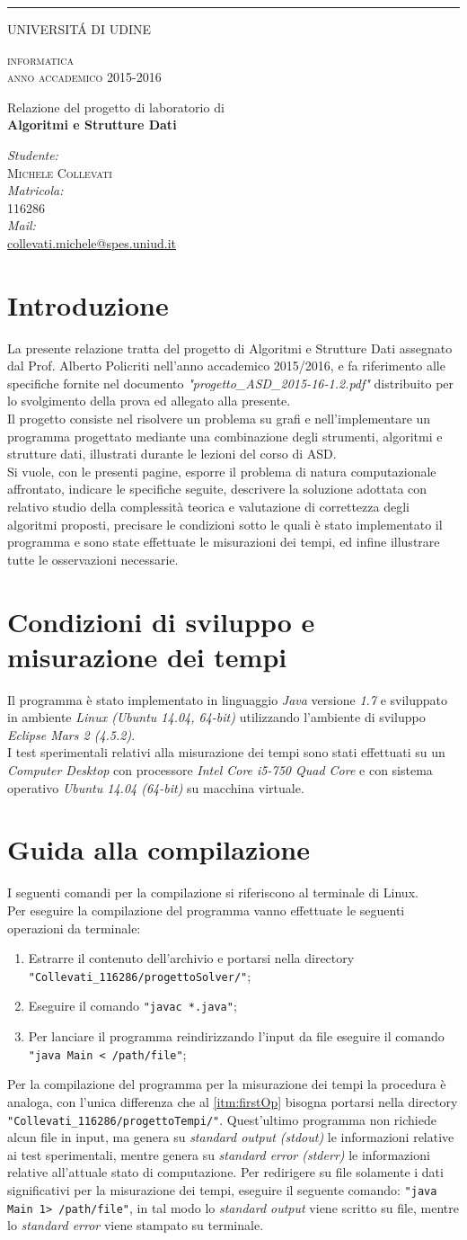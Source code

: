 \documentclass[10pt,a4paper,oneside,article,italian]{memoir}
\makeatletter
\newcommand{\mytitle}{
  \thispagestyle{empty}
  {
    \rule{2pt}{\textheight}
    \hspace{5pt}
    \parbox[b][\textheight]{0.85\textwidth}{
      \vspace{50pt}
      
      \Huge \textsc{UNIVERSIT\'A DI UDINE} \large \\
      \vspace{20pt}
      
      \huge \textsc{informatica} \large \\
      
      \Large \textsc{anno accademico 2015-2016} \large \\
      \vspace{70pt}
      
      \huge Relazione del progetto di laboratorio di \\
      \Huge \textbf{Algoritmi e Strutture Dati} \\
      \vspace{70pt}

      \large \emph{Studente:} \\
      \textsc{Michele Collevati} \\[0.2cm]

      \large \emph{Matricola:} \\
      \textsc{116286} \\[0.2cm]

      \large \emph{Mail:} \\
      \large \href{mailto:collevati.michele@spes.uniud.it}
                {collevati.michele@spes.uniud.it} \\[0.2cm]

      \vfill
    }
  }
}
\newcommand{\capitolo}{\newpage\chapter}
\theoremstyle{definition}
\makeatother
\begin{document}
\mytitle
\tableofcontents*
\capitolo{Introduzione}
La presente relazione tratta del progetto di Algoritmi e Strutture Dati assegnato dal Prof. Alberto Policriti nell'anno accademico 2015/2016, e fa riferimento alle specifiche fornite nel documento \textit{"progetto\_ASD\_2015-16-1.2.pdf"} distribuito per lo svolgimento della prova ed allegato alla presente.\\
Il progetto consiste nel risolvere un problema su grafi e nell'implementare un programma progettato mediante una combinazione degli strumenti, algoritmi e strutture dati, illustrati durante le lezioni del corso di ASD.\\
Si vuole, con le presenti pagine, esporre il problema di natura computazionale affrontato, indicare le specifiche seguite, descrivere la soluzione adottata con relativo studio della complessità teorica e valutazione di correttezza degli algoritmi proposti, precisare le condizioni sotto le quali è stato implementato il programma e sono state effettuate le misurazioni dei tempi, ed infine illustrare tutte le osservazioni necessarie.

\capitolo{Condizioni di sviluppo e misurazione dei tempi}
Il programma è stato implementato in linguaggio \textit{Java} versione \textit{1.7} e sviluppato in ambiente \textit{Linux (Ubuntu 14.04, 64-bit)} utilizzando l'ambiente di sviluppo \textit{Eclipse Mars 2 (4.5.2)}.\\
I test sperimentali relativi alla misurazione dei tempi sono stati effettuati su un \textit{Computer Desktop} con processore \textit{Intel Core i5-750 Quad Core} e con sistema operativo \textit{Ubuntu 14.04 (64-bit)} su macchina virtuale.

\capitolo{Guida alla compilazione}
I seguenti comandi per la compilazione si riferiscono al terminale di Linux.\\
Per eseguire la compilazione del programma vanno effettuate le seguenti operazioni da terminale:
\begin{enumerate}[label=(\arabic*)]
\item \label{itm:firstOp} Estrarre il contenuto dell'archivio e portarsi nella directory\\
\texttt{"Collevati\_116286/progettoSolver/"};
\item Eseguire il comando \texttt{"javac *.java"};
\item Per lanciare il programma reindirizzando l'input da file eseguire il comando \texttt{"java Main < /path/file"};
\end{enumerate}
Per la compilazione del programma per la misurazione dei tempi la procedura è analoga, con l'unica differenza che al \cref{itm:firstOp} bisogna portarsi nella directory \texttt{"Collevati\_116286/progettoTempi/"}. Quest'ultimo programma non richiede alcun file in input, ma genera su \textit{standard output (stdout)} le informazioni relative ai test sperimentali, mentre genera su \textit{standard error (stderr)} le informazioni relative all'attuale stato di computazione. Per redirigere su file solamente i dati significativi per la misurazione dei tempi, eseguire il seguente comando: \texttt{"java Main 1> /path/file"}, in tal modo lo \textit{standard output} viene scritto su file, mentre lo \textit{standard error} viene stampato su terminale.
\end{document}
